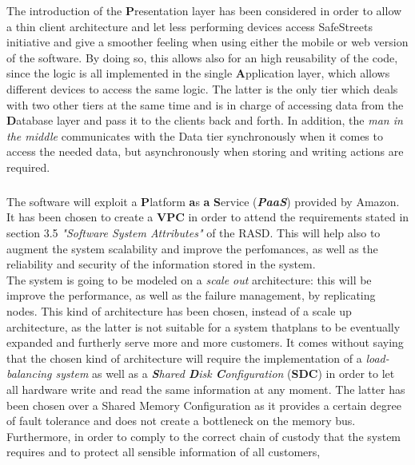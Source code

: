     The introduction of the \textbf{P}resentation layer has been considered in
    order to allow a thin client architecture and let less performing devices
    access SafeStreets initiative and give a smoother feeling when using either
    the mobile or web version of the software. By doing so, this allows also for
    an high reusability of the code, since the logic is all implemented in the
    single \textbf{A}pplication layer, which allows different devices to access
    the same logic. The latter is the only tier which deals with two other tiers
    at the same time and is in charge of accessing data from the
    \textbf{D}atabase layer and pass it to the clients back and forth. In
    addition, the \emph{man in the middle} communicates with the Data tier
    synchronously when it comes to access the needed data, but asynchronously
    when storing and writing actions are required.\\
    \\
    The software will exploit a \textbf{P}latform \textbf{a}s \textbf{a}
    \textbf{S}ervice (\textbf{\emph{PaaS}}) provided by
    Amazon\textsuperscript{\textcopyright}. It has been chosen to create a
    \textbf{V}\textbf{P}\textbf{C} in order to attend the requirements stated in
    section 3.5 \emph{"Software System Attributes"} of the RASD. This will help
    also to augment the system scalability and improve the perfomances, as well
    as the reliability and security of the information stored in the system. \\
    The system is going to be modeled on a \emph{scale out} architecture: this
    will be improve the performance, as well as the failure management, by
    replicating nodes. This kind of architecture has been chosen, instead of a
    scale up architecture, as the latter is not suitable for a system thatplans
    to be eventually expanded and furtherly serve more and more customers. It
    comes without saying that the chosen kind of architecture will require the
    implementation of a \emph{load-balancing system} as well as a
    \emph{\textbf{S}hared \textbf{D}isk \textbf{C}onfiguration} (\textbf{SDC})
    in order to let all hardware write and read the same information at any
    moment. The latter has been chosen over a Shared Memory Configuration as it
    provides a certain degree of fault tolerance and does not create a
    bottleneck on the memory bus.\\
    Furthermore, in order to comply to the correct chain of custody that the
    system requires and to protect all sensible information of all customers,
